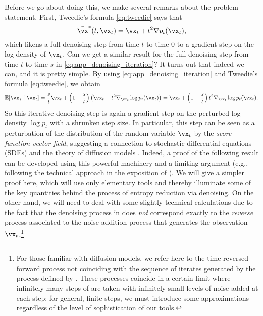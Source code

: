 \documentclass[../../book-main.tex]{subfiles}
\begin{document}
Before we go about doing this, we make several remarks about the problem statement. First, Tweedie's formula \eqref{eq:tweedie} says that 
\begin{equation}
    \bar{\vx}^{\ast}(t, \vx_{t}) = \vx_{t} + t^{2}\nabla p_{t}(\vx_{t}),
\end{equation}
which likens a full denoising step from time \(t\) to time \(0\) to a gradient step on the log-density of \(\vx_{t}\). Can we get a similar result for the full denoising step from time \(t\) to time \(s\) in \eqref{eq:app_denoising_iteration}? It turns out that indeed we can, and it is pretty simple. By using \eqref{eq:app_denoising_iteration} and Tweedie's formula \eqref{eq:tweedie}, we obtain
\begin{equation}\label{eq:app_denoising_iteration_score}
    \Ex[\vx_{s} \mid \vx_{t}] = \frac{s}{t}\vx_{t} + \bp{1 - \frac{s}{t}}\bp{\vx_{t} + t^{2}\nabla_{\vx_{t}}\log p_{t}(\vx_{t})} = \vx_{t} + \bp{1 - \frac{s}{t}}t^{2}\nabla_{\vx_{t}}\log p_{t}(\vx_{t}).
\end{equation}
So this iterative denoising step is again a gradient step on the perturbed log-density \(\log p_{t}\) with a shrunken step size. In particular, this step can be seen as a perturbation of the distribution of the random variable \(\vx_{t}\) by the \textit{score function vector field}, suggesting a connection to stochastic differential equations (SDEs) and the theory of diffusion models \cite{song2020score}. Indeed, a proof of the following result  can be developed using this powerful machinery and a limiting argument (e.g., following the technical approach in the exposition of \cite{DBLP:conf/iclr/ChenC0LSZ23}). We will give a simpler proof here, which will use only elementary tools and  thereby illuminate some of the key quantities behind the process of entropy reduction via denoising. On the other hand, we will need to deal with some slightly technical calculations due to the fact that the denoising process in  does \textit{not} correspond exactly to the \textit{reverse} process associated to the noise addition process that generates the observation \(\vx_{t}\).\footnote{For those familiar with diffusion models, we refer here to the time-reversed forward process not coinciding with the sequence of iterates generated by the process defined by . These processes coincide in a certain limit where infinitely many steps of  are taken with infinitely small levels of noise added at each step; for general, finite steps, we must introduce some approximations regardless of the level of sophistication of our tools.}
\end{document}
